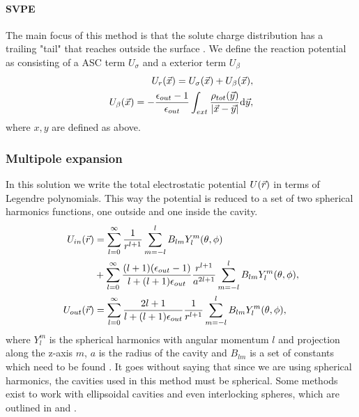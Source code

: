 \documentclass[../Thesis.tex]{subfiles}
\begin{document}
\paragraph{\ac{SVPE}}
The main focus of this method is that the solute charge distribution has a trailing
"tail" that reaches outside the surface \cite{Tomasi:2005ipa}. We define the
reaction potential as consisting of a \ac{ASC} term $U_{\sigma}$ and a exterior
term $U_{\beta}$
\begin{align}
  \begin{split}
    U_r(\vec{x}) = U_{\sigma}(\vec{x}) + U_{\beta}(\vec{x}),\\
    U_{\beta}(\vec{x}) = -\frac{\epsilon_{out} - 1}{\epsilon_{out}}\int_{ext} \frac{\rho_{tot}(\vec{y})}{\abs{\vec{x} - \vec{y}}} \text{d}\vec{y},
  \end{split}
\end{align}
where $x, y$ are defined as above.

\subsubsection{Multipole expansion}
In this solution we write the total electrostatic potential $U(\vec{r})$ in terms
of Legendre polynomials. This way the potential is reduced to a set of two
spherical harmonics functions, one outside and one inside the cavity.
\begin{align}
  \begin{split}
    U_{in}(\vec{r}) &= \sum_{l=0}^{\infty}\frac{1}{r^{l+1}}\sum^l_{m=-l}B_{lm}Y^m_l(\theta, \phi) \\
    &+ \sum_{l=0}^{\infty}\frac{(l+1)(\epsilon_{out} - 1)}{l + (l+1)\epsilon_{out}} \frac{r^{l+1}}{a^{2l+1}}\sum^l_{m=-l}B_{lm}Y^m_l(\theta, \phi),\\
    U_{out}(\vec{r})
    &=\sum_{l=0}^{\infty}\frac{2l+1}{l+(l+1)\epsilon_{out}}\frac{1}{r^{l+1}}\sum^l_{m=-l}B_{lm}Y^m_l(\theta, \phi),
  \end{split}
\end{align}
where $Y^m_l$ is the spherical harmonics with angular momentum $l$ and projection
along the z-axis $m$, $a$ is the radius of the cavity and $B_{lm}$ is a set of
constants which need to be found \cite{Tomasi:1994wt}. It goes without saying that
since we are using spherical harmonics, the cavities used in this method must be
spherical. Some methods exist to work with ellipsoidal cavities and even interlocking
spheres, which are outlined in \cite{Tomasi:1994wt} and \cite{Tomasi:2005ipa}.
\end{document}
